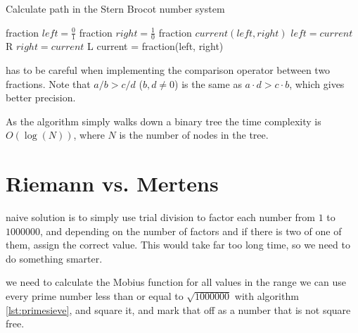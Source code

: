 \documentclass[11pt,a4paper,twoside]{article}
\begin{document}
\begin{algorithm}
    \caption{Calculate path in the Stern Brocot number system}
    \label{lst:sternbrocot}
    \begin{algorithmic}
        \STATE fraction $left = \frac{0}{1}$
        \STATE fraction $right = \frac{1}{0}$
        \STATE fraction $current(left, right)$ 
                \STATE $left = current$
                \PRINT R
            \ELSE
                \STATE $right = current$
                \PRINT L
            \ENDIF
            \STATE current = fraction(left, right) 
        \ENDWHILE
    \end{algorithmic}
\end{algorithm}

 has to be careful when implementing the comparison operator
between two fractions.  Note that $a/b > c/d$ ($b,d \neq 0$) is the same as $a
\cdot d > c \cdot b$, which gives better precision.

As the algorithm simply walks down a binary tree the time complexity is
$O(\log(N))$, where $N$ is the number of nodes in the tree.



\section{Riemann vs. Mertens}

 naive solution is to simply use trial division to factor each
number from $1$ to $1000000$, and depending on the number of factors and if
there is two of one of them, assign the correct value. This would take far too
long time, so we need to do something smarter.

 we need to calculate the Mobius function for all values in the
range we can use every prime number less than or equal to $\sqrt{1000000}$ with
algorithm \ref{lst:primesieve}, and square it, and mark that off as a number
that is not square free.
\end{document}
